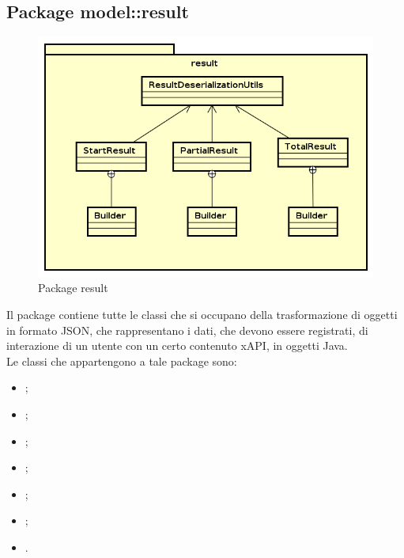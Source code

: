 \documentclass[../Tesi.tex]{subfiles}
\begin{document}
	\subsection{Package model::result}
		\begin{figure}[H]
			\centering
			\includegraphics[scale=0.6]{images/package_diagrams/result}
				\caption{Package result}
		\end{figure}
		Il package  contiene tutte le classi che si occupano della trasformazione di oggetti in formato JSON, che rappresentano i dati, che devono essere registrati, di interazione di un utente con un certo contenuto xAPI, in oggetti Java. \\
		Le classi che appartengono a tale package sono:
		\begin{itemize}
			\item {};
			\item {};
			\item {};
			\item {};
			\item {};
			\item {};
			\item {}.
		\end{itemize}
\end{document}
